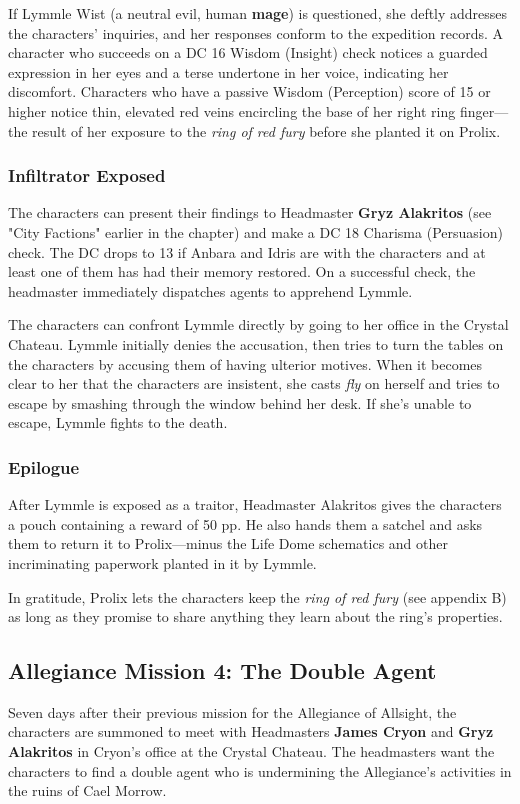 \documentclass[10pt,a4paper,twoside,fancy,bg=print,twocolumn,openany,nodeprecatedcode]{dndbook}
\begin{document}
If Lymmle Wist (a neutral evil, human \textbf{mage}) is questioned, she deftly addresses the characters' inquiries, and her responses conform to the expedition records. A character who succeeds on a DC 16 Wisdom (Insight) check notices a guarded expression in her eyes and a terse undertone in her voice, indicating her discomfort. Characters who have a passive Wisdom (Perception) score of 15 or higher notice thin, elevated red veins encircling the base of her right ring finger—the result of her exposure to the \textit{ring of red fury} before she planted it on Prolix.

\subsubsection{Infiltrator Exposed}
The characters can present their findings to Headmaster \textbf{Gryz Alakritos} (see "City Factions" earlier in the chapter) and make a DC 18 Charisma (Persuasion) check. The DC drops to 13 if Anbara and Idris are with the characters and at least one of them has had their memory restored. On a successful check, the headmaster immediately dispatches agents to apprehend Lymmle.

The characters can confront Lymmle directly by going to her office in the Crystal Chateau. Lymmle initially denies the accusation, then tries to turn the tables on the characters by accusing them of having ulterior motives. When it becomes clear to her that the characters are insistent, she casts \textit{fly} on herself and tries to escape by smashing through the window behind her desk. If she's unable to escape, Lymmle fights to the death.

\subsubsection{Epilogue}
After Lymmle is exposed as a traitor, Headmaster Alakritos gives the characters a pouch containing a reward of 50 pp. He also hands them a satchel and asks them to return it to Prolix—minus the Life Dome schematics and other incriminating paperwork planted in it by Lymmle.

In gratitude, Prolix lets the characters keep the \textit{ring of red fury} (see appendix B) as long as they promise to share anything they learn about the ring's properties.

\subsection{Allegiance Mission 4: The Double Agent}
Seven days after their previous mission for the Allegiance of Allsight, the characters are summoned to meet with Headmasters \textbf{James Cryon} and \textbf{Gryz Alakritos} in Cryon's office at the Crystal Chateau. The headmasters want the characters to find a double agent who is undermining the Allegiance's activities in the ruins of Cael Morrow.
\end{document}
